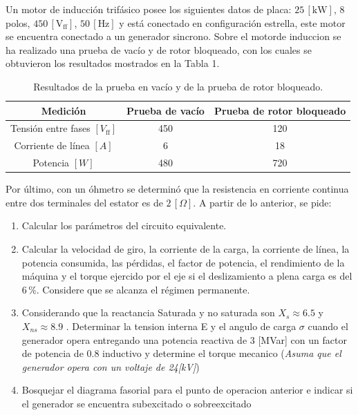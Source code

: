 \documentclass[
  11pt,
  letterpaper,
   addpoints,
   answers
  ]{exam}
\begin{document}
\begin{questions}
    \question Un motor de inducción trifásico posee los siguientes datos de placa: \(25 \, [\text{kW}]\), 8 polos, \(450 \, [\text{V}_{\text{ff}}]\), \(50 \, [\text{Hz}]\) y está conectado en configuración estrella, este motor se encuentra conectado a un generador sincrono. Sobre el motorde induccion  se ha realizado una prueba de vacío y de rotor bloqueado, con los cuales se obtuvieron los resultados mostrados en la Tabla 1.
    \begin{table}[h!]
        \centering
        \caption{Resultados de la prueba en vacío y de la prueba de rotor bloqueado.}
        \begin{tabular}{|c|c|c|}
            \hline
            \textbf{Medición} & \textbf{Prueba de vacío} & \textbf{Prueba de rotor bloqueado} \\ \hline
            Tensión entre fases \([V_{\text{ff}}]\) & 450 & 120 \\ \hline
            Corriente de línea \([A]\) & 6 & 18 \\ \hline
            Potencia \([W]\) & 480 & 720 \\ \hline
        \end{tabular}
    \end{table}
    
    Por último, con un óhmetro se determinó que la resistencia en corriente continua entre dos terminales del estator es de \(2 \, [\Omega]\). A partir de lo anterior, se pide:
    
    \begin{enumerate}
        \item Calcular los parámetros del circuito equivalente.
        \item Calcular la velocidad de giro, la corriente de la carga, la corriente de línea, la potencia consumida, las pérdidas, el factor de potencia, el rendimiento de la máquina y el torque ejercido por el eje si el deslizamiento a plena carga es del \(6 \, \%\). Considere que se alcanza el régimen permanente.
        \item Considerando que la reactancia Saturada y no saturada son $X_{s}\approx 6.5$ y $X_{ns}\approx 8.9$  . Determinar la tension interna E y el angulo de carga $\sigma$ cuando el generador opera entregando una potencia reactiva de 3 [MVar] con un factor de potencia de 0.8 inductivo y determine el torque mecanico (\textit{Asuma que el generador opera con un voltaje de 24[kV]})
        \item Bosquejar el diagrama fasorial para el punto de operacion anterior e indicar si el generador se encuentra
        subexcitado o sobreexcitado
    \end{enumerate}


\end{questions}
\end{document}
